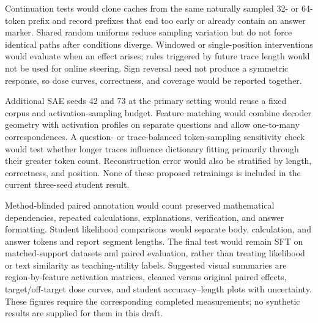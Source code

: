 Continuation tests would clone caches from the same naturally sampled 32- or 64-token prefix and record prefixes that end too early or already contain an answer marker.
Shared random uniforms reduce sampling variation but do not force identical paths after conditions diverge.
Windowed or single-position interventions would evaluate when an effect arises; rules triggered by future trace length would not be used for online steering.
Sign reversal need not produce a symmetric response, so dose curves, correctness, and coverage would be reported together.

Additional SAE seeds 42 and 73 at the primary setting would reuse a fixed corpus and activation-sampling budget.
Feature matching would combine decoder geometry with activation profiles on separate questions and allow one-to-many correspondences.
A question- or trace-balanced token-sampling sensitivity check would test whether longer traces influence dictionary fitting primarily through their greater token count.
Reconstruction error would also be stratified by length, correctness, and position.
None of these proposed retrainings is included in the current three-seed student result.

Method-blinded paired annotation would count preserved mathematical dependencies, repeated calculations, explanations, verification, and answer formatting.
Student likelihood comparisons would separate body, calculation, and answer tokens and report segment lengths.
The final test would remain SFT on matched-support datasets and paired evaluation, rather than treating likelihood or text similarity as teaching-utility labels.
Suggested visual summaries are region-by-feature activation matrices, cleaned versus original paired effects, target/off-target dose curves, and student accuracy--length plots with uncertainty.
These figures require the corresponding completed measurements; no synthetic results are supplied for them in this draft.
